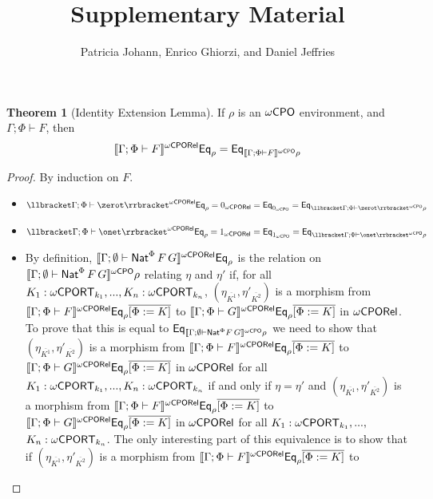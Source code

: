 \documentclass[acmsmall,review,anonymous]{acmart}
\title[Supplementary Material]{Supplementary Material} %
\author{Patricia Johann, Enrico Ghiorzi, and Daniel Jeffries}
\affiliation{
  \institution{Appalachian State University}            %
}
\theoremstyle{definition}
\newtheorem*{nono-theorem}{Theorem}
\begin{document}
\maketitle

\begin{nono-theorem}[Identity Extension Lemma]\label{thm:iel}
If $\rho$ is an ${\omega\mathsf{CPO}}$ environment, and $\Gamma; \Phi \vdash F$, then
\[\llbracket{\Gamma; \Phi \vdash F}\rrbracket^{{\omega\mathsf{CPORel}}} \mathsf{Eq}_\rho = \mathsf{Eq}_{\llbracket{\Gamma; \Phi
    \vdash F}\rrbracket^{{\omega\mathsf{CPO}}}\rho}\]
\end{nono-theorem}
\begin{proof}
By induction on $F$.
\begin{itemize}
\item $\oCPORsem{\Gamma; \Phi \vdash \zerot} \Eq_{\rho} = 0_\oCPOR =
  \Eq_{0_\oCPO} = \Eq_{\oCPOsem{\Gamma; \Phi \vdash \zerot}\rho}$
\item $\oCPORsem{\Gamma; \Phi \vdash \onet} \Eq_{\rho} = 1_\oCPOR =
  \Eq_{1_\oCPO} = \Eq_{\oCPOsem{\Gamma; \Phi \vdash \onet}\rho}$
\item
By definition, $\llbracket{\Gamma; \emptyset \vdash \mathsf{Nat}^\Phi \,F\,G}\rrbracket^{{\omega\mathsf{CPORel}}}
\mathsf{Eq}_{\rho}$ is the relation on $\llbracket{\Gamma; \emptyset \vdash
  \mathsf{Nat}^\Phi \,F\,G}\rrbracket^{{\omega\mathsf{CPO}}} \rho$ relating $\eta$ and $\eta'$ if, for all $K_1
: {\omega\mathsf{CPORT}}_{k_1},...,K_n : {\omega\mathsf{CPORT}}_{k_n}$, $(\eta_{\overline{K^1}},
\eta'_{\overline{K^2}})$ is a morphism from $\llbracket{\Gamma; \Phi
  \vdash F}\rrbracket^{{\omega\mathsf{CPORel}}} \mathsf{Eq}_{\rho}\overline{[\Phi := K]}$ to $\llbracket{\Gamma ;
  \Phi \vdash G}\rrbracket^{{\omega\mathsf{CPORel}}} \mathsf{Eq}_{\rho}\overline{[\Phi := K]}$ in ${\omega\mathsf{CPORel}}$.  To
prove that this is equal to $\mathsf{Eq}_{\llbracket{\Gamma; \emptyset \vdash
    \mathsf{Nat}^\Phi F\,G}\rrbracket^{{\omega\mathsf{CPO}}} \rho}$ we need to show that
$(\eta_{\overline{K^1}}, \eta'_{\overline{K^2}})$ is a morphism from
$\llbracket{\Gamma; \Phi \vdash F}\rrbracket^{{\omega\mathsf{CPORel}}} \mathsf{Eq}_{\rho}\overline{[\Phi := K]}$ to
$\llbracket{\Gamma ; \Phi \vdash G}\rrbracket^{{\omega\mathsf{CPORel}}} \mathsf{Eq}_{\rho}\overline{[\Phi := K]}$
in ${\omega\mathsf{CPORel}}$ for all $K_1 : {\omega\mathsf{CPORT}}_{k_1},...,K_n : {\omega\mathsf{CPORT}}_{k_n}$ if
and only if $\eta = \eta'$ and $(\eta_{\overline{K^1}},
\eta'_{\overline{K^2}})$ is a morphism from $\llbracket{\Gamma; \Phi
  \vdash F}\rrbracket^{{\omega\mathsf{CPORel}}} \mathsf{Eq}_{\rho}\overline{[\Phi := K]}$ to $\llbracket{\Gamma ;
  \Phi \vdash G}\rrbracket^{{\omega\mathsf{CPORel}}} \mathsf{Eq}_{\rho}\overline{[\Phi := K]}$ in ${\omega\mathsf{CPORel}}$ for all
$K_1 : {\omega\mathsf{CPORT}}_{k_1},...,$ $ K_n : {\omega\mathsf{CPORT}}_{k_n}$.  The only
interesting part of this equivalence is to show that if
$(\eta_{\overline{K^1}}, \eta'_{\overline{K^2}})$ is a morphism from
$\llbracket{\Gamma; \Phi \vdash F}\rrbracket^{{\omega\mathsf{CPORel}}} \mathsf{Eq}_{\rho}\overline{[\Phi := K]}$ to

\end{itemize}
\end{proof}
\end{document}
